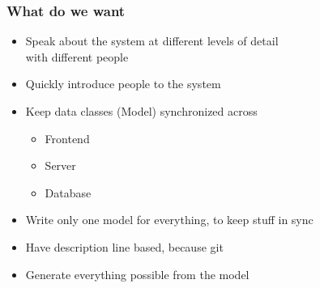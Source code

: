 \documentclass[xelatex,13pt]{beamer}
\begin{document}
\begin{frame}
	\frametitle{What do we want}
	\begin{itemize}
		\item Speak about the system at different levels of detail\\
		with different people
		\item Quickly introduce people to the system
		\item Keep data classes (Model) synchronized across
		\begin{itemize}
			\item Frontend
			\item Server
			\item Database
		\end{itemize}
		\item Write only one model for everything, to keep stuff in sync
		\item Have description line based, because git
		\item Generate everything possible from the model
	\end{itemize}
\end{frame}
\end{document}
